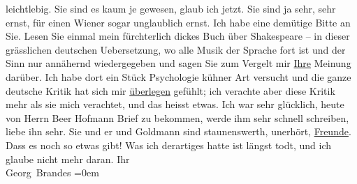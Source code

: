 \begin{ledgroupsized}[t]{13cm}
               leichtlebig. Sie sind es kaum je gewesen, glaub ich jetzt. Sie sind ja sehr, sehr
               ernst, für einen Wiener sogar unglaublich ernst.\pend
           \pstart
           Ich habe eine demütige Bitte an Sie. Lesen Sie einmal mein fürchterlich dickes Buch über Shakespeare – in dieser grässlichen deutschen Uebersetzung, wo
               alle Musik der Sprache fort ist und der Sinn nur annähernd wiedergegeben und sagen
               Sie zum Vergelt mir \uline{Ihre} Meinung darüber. Ich habe
               dort ein Stück Psychologie kühner Art versucht und die ganze deutsche Kritik hat sich
               mir \uline{überlegen} gefühlt; ich verachte aber diese Kritik
               mehr als sie mich verachtet, und das heisst etwas.\pend
           \pstart
           Ich war sehr glücklich, heute von Herrn Beer
                  Hofmann Brief zu bekommen, werde ihm sehr schnell schreiben, liebe ihn sehr.
               Sie und er und Goldmann sind staunenswerth,
               unerhört, \uline{Freunde}. Dass es noch so etwas gibt! Was
               ich derartiges hatte ist längst todt, und ich glaube nicht mehr daran.\pend
           \pstart
           Ihr{\\[\baselineskip]}\spacefill\mbox{Georg Brandes}\pend
           \leftskip=0em{}
         
         \endnumbering{}\end{ledgroupsized}  \newcommand{\dateiname}{L00639}\newcommand{\titel}{Georg Brandes an Arthur Schnitzler, 16. 1. 1897}\newcommand{\editorInnen}{Martin Anton Müller und Gerd-Hermann Susen}
      